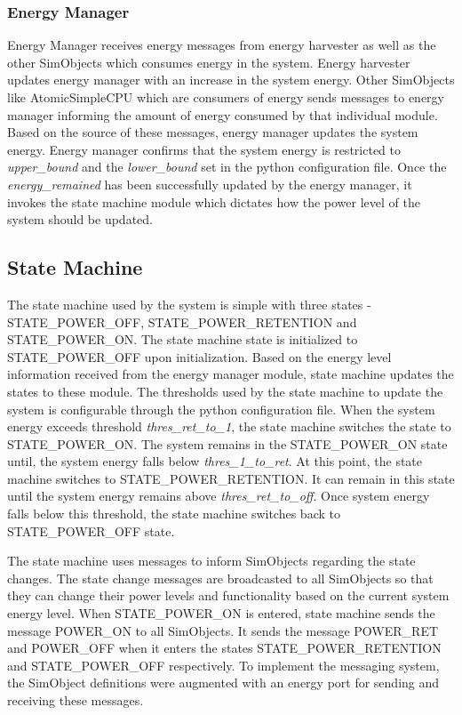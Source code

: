 \documentclass[conference]{IEEEtran}
\begin{document}
\subsubsection{Energy Manager}
Energy Manager receives energy messages from energy harvester as well as the other SimObjects which consumes energy in the system. Energy harvester updates energy manager with an increase in the system energy. Other SimObjects like AtomicSimpleCPU which are consumers of energy sends messages to energy manager informing the amount of energy consumed by that individual module. Based on the source of these messages, energy manager updates the system energy. Energy manager confirms that the system energy is restricted to \textit{upper\_bound} and the \textit{lower\_bound} set in the python configuration file. Once the \textit{energy\_remained} has been successfully updated by the energy manager, it invokes the state machine module which dictates how the power level of the system should be updated. 

\subsection{State Machine}
The state machine used by the system is simple with three states - STATE\_POWER\_OFF, STATE\_POWER\_RETENTION and STATE\_POWER\_ON. The state machine state is initialized to STATE\_POWER\_OFF upon initialization. Based on the energy level information received from the energy manager module, state machine updates the states to these module. The thresholds used by the state machine to update the system is configurable through the python configuration file. When the system energy exceeds threshold \textit{thres\_ret\_to\_1}, the state machine switches the state to STATE\_POWER\_ON. The system remains in the STATE\_POWER\_ON state until, the system energy falls below  \textit{thres\_1\_to\_ret}. At this point, the state machine switches to STATE\_POWER\_RETENTION. It can remain in this state until the system energy remains above \textit{thres\_ret\_to\_off}. Once system energy falls below this threshold, the state machine switches back to STATE\_POWER\_OFF state.

The state machine uses messages to inform SimObjects regarding the state changes. The state change messages are broadcasted to all SimObjects so that they can change their power levels and functionality based on the current system energy level. When STATE\_POWER\_ON is entered, state machine sends the message POWER\_ON to all SimObjects. It sends the message POWER\_RET and POWER\_OFF when it enters the states STATE\_POWER\_RETENTION and STATE\_POWER\_OFF respectively. To implement the messaging system, the SimObject definitions were augmented with an energy port for sending and receiving these messages. 
\end{document}
